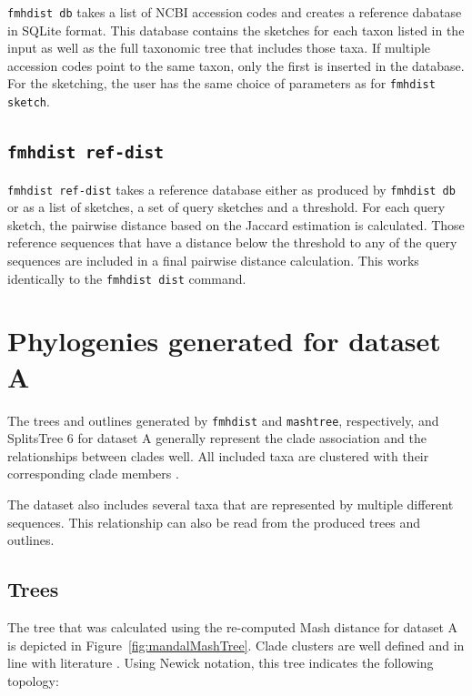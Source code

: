 \texttt{fmhdist db} takes a list of NCBI accession codes and creates a reference
dabatase in SQLite format. This database contains the sketches for each taxon
listed in the input as well as the full taxonomic tree that includes those taxa.
If multiple accession codes point to the same taxon, only the first is inserted
in the database. For the sketching, the user has the same choice of parameters
as for \texttt{fmhdist sketch}.

\subsection*{\texttt{fmhdist ref-dist}}

\texttt{fmhdist ref-dist} takes a reference database either as produced by
\texttt{fmhdist db} or as a list of sketches, a set of query sketches and a
threshold. For each query sketch, the pairwise distance based on the Jaccard
estimation is calculated. Those reference sequences that have a distance below
the threshold to any of the query sequences are included in a final pairwise
distance calculation. This works identically to the \texttt{fmhdist dist}
command.


\section{Phylogenies generated for dataset A} 
The trees and outlines generated by \texttt{fmhdist} and \texttt{mashtree},
respectively, and SplitsTree 6
\cite{husonApplicationPhylogeneticNetworks2006,bagciMicrobialPhylogeneticContext2021}
for dataset A generally represent the clade association and the relationships
between clades well. All included taxa are clustered with their corresponding
clade members
\cite{abadPhytophthoraTaxonomicPhylogenetic2023a,yangExpandedPhylogenyGenus2017}.

The dataset also includes several taxa that are represented by multiple
different sequences. This relationship can also be read from the produced trees
and outlines.

\subsection*{Trees}
The tree that was calculated using the re-computed Mash distance for dataset
A is depicted in Figure~\ref{fig:mandalMashTree}. Clade clusters are well
defined and in line with literature
\cite{abadPhytophthoraTaxonomicPhylogenetic2023a,yangExpandedPhylogenyGenus2017}.
Using Newick notation, this tree indicates the following topology: 

